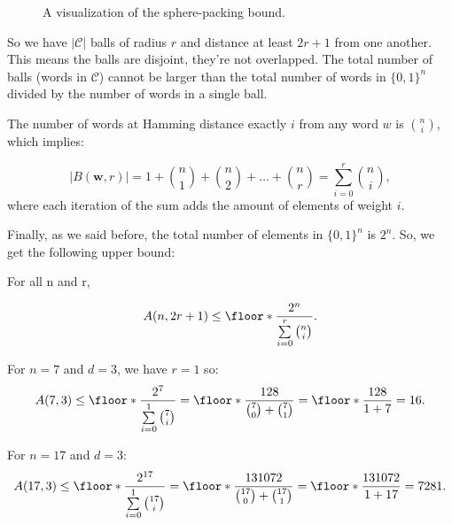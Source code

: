\begin{figure}[ht!]
    \label{sphere-vis}
    \centering
\caption{A visualization of the sphere-packing bound.}
\end{figure}

So we have $|\mathcal{C}|$ balls of radius $r$ and distance at least $2r+1$ from one another. This means the balls are disjoint, they're not overlapped. The total number of balls (words in $\mathcal{C}$) cannot be larger than the total number of words in $\{0,1\}^n$  divided by the number of words in a single ball.

The number of words at Hamming distance exactly $i$ from any word $w$ is ${n \choose i}$, which implies:

\begin{equation*}
    |B(\mathbf{w}, r)| = 1 + {n \choose 1} + {n \choose 2} + \dots + {n \choose r} = \sum_{i=0}^{r} {n \choose i},
\end{equation*}
where each iteration of the sum adds the amount of elements of weight $i$.

Finally, as we said before, the total number of elements in $\{0,1\}^n$ is $2^n$. So, we get the following upper bound:

\begin{lemma}
    For all n and r,

    \begin{equation}
        A(n, 2r+1) \leq \floor*{\frac{2^n}{\sum\limits_{i=0}^{r}{n \choose i}}}.
    \end{equation}
\end{lemma}

\begin{example}
    For $n=7$ and $d=3$, we have $r=1$ so:
    \begin{equation*}
        A(7,3) \leq \floor*{\frac{2^7}{\sum\limits_{i=0}^{1}{7 \choose i}}} = \floor*{\frac{128}{{7 \choose 0} + {7 \choose 1}}} = \floor*{\frac{128}{1 + 7}} = 16.
    \end{equation*}
\end{example}

\begin{example}
    For $n=17$ and $d=3$:
    \begin{equation*}
        A(17,3) \leq \floor*{\frac{2^{17}}{\sum\limits_{i=0}^{1}{17 \choose i}}} = \floor*{\frac{131072}{{17 \choose 0} + {17 \choose 1}}} = \floor*{\frac{131072}{1 + 17}} = 7281.
    \end{equation*}
\end{example}

